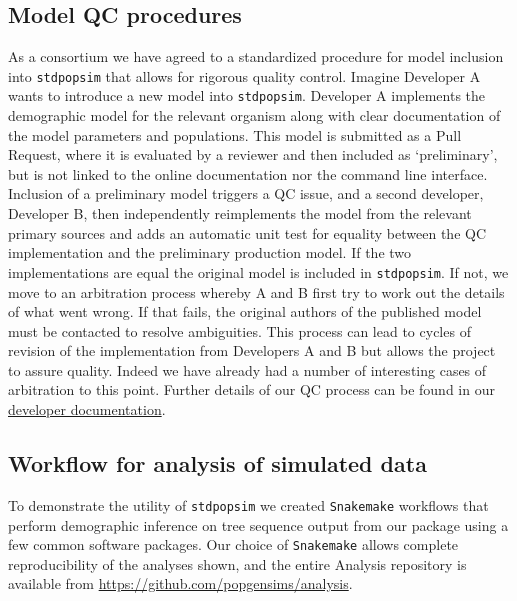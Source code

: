 \documentclass[12pt,halfline,a4paper]{ouparticle}
\newcommand{\stdpopsim}{\texttt{stdpopsim}\xspace}
\begin{document}
\subsection*{Model QC procedures}
As a consortium we have agreed to a standardized procedure for model inclusion
into \stdpopsim that allows for rigorous quality control. Imagine Developer A
wants to introduce a new model into \stdpopsim. Developer A implements the
demographic model for the relevant organism along with clear documentation
of the model parameters and populations. This model is submitted as a Pull Request,
where it is evaluated by a reviewer and then included as `preliminary',
but is not linked to the online documentation nor the command line interface.
Inclusion of a preliminary model triggers a QC issue, and a second developer,
Developer B, then independently reimplements the model from the relevant
primary sources and adds an automatic unit test for equality between the
QC implementation and the preliminary production model. If the two
implementations are equal the original model is included in \stdpopsim.
If not, we move to an arbitration process whereby A and B first try
to work out the details of what went wrong. If that fails, the original
authors of the published model must be contacted
to resolve ambiguities. This process can lead to cycles of revision of
the implementation from Developers A and B but allows the project to assure
quality. Indeed we have already had a number of interesting cases of arbitration
to this point. Further details of our QC process can be found in our
\href{https://stdpopsim.readthedocs.io/en/latest/development.html#}{developer documentation}.

\subsection*{Workflow for analysis of simulated data}
To demonstrate the utility of \stdpopsim we created \texttt{Snakemake}
workflows \citep{koster2012snakemake} that perform demographic inference on
tree sequence output from our package using a few common software packages.
Our choice of \texttt{Snakemake} allows complete reproducibility of the
analyses shown, and the entire Analysis repository is available from
\url{https://github.com/popgensims/analysis}.
\end{document}
